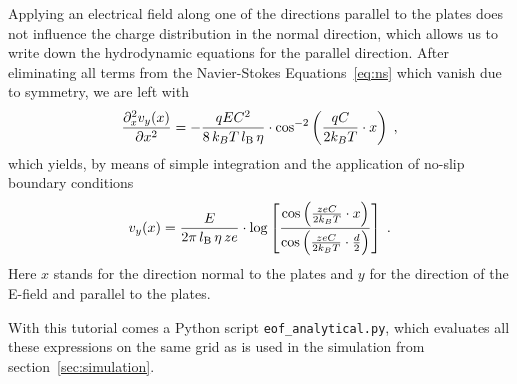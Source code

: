 Applying an electrical field along one of the directions
parallel to the plates does not influence the charge distribution in the normal direction, which allows us to write down the hydrodynamic equations for the parallel direction. After eliminating all terms from the Navier-Stokes Equations~\eqref{eq:ns} which vanish due to symmetry, we are left with
\begin{align}
  \frac{\partial_x^2 v_y(x)}{\partial x^2} = -\frac{q E C^2}{8 \, k_{B}T \, l_\mathrm{B} \, \eta} \cdot \cos^{-2} \left( \frac{qC}{2 k_{B}T} \cdot x \right) \; ,
\end{align}
which yields, by means of simple integration and the application of no-slip
boundary conditions
\begin{align}
  v_y(x) = \frac{E}{2 \pi \, l_\mathrm{B} \, \eta \, ze} \cdot \log \left[ \frac{\cos \left( \frac{zeC}{2 k_{B}T} \cdot x \right)}{\cos \left( \frac{zeC}{2 k_{B}T} \cdot \frac d 2 \right)} \right] \; .
\end{align}
Here $x$ stands for the direction normal to the plates and $y$ for the direction of the
E-field and parallel to the plates.

With this tutorial comes a Python script \texttt{eof\_analytical.py}, which evaluates all these expressions on the same grid as is used in the simulation from section~\ref{sec:simulation}.

\pagebreak
